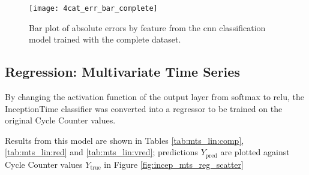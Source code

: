 \begin{figure}
    \centering
    \texttt{[image: 4cat\_err\_bar\_complete]}
    \caption{\label{fig:classif_pred_hist} Bar plot of absolute errors by feature from the \ac{cnn} classification model trained with the complete dataset.}
\end{figure}

\subsection{Regression: Multivariate Time Series}
By changing the activation function of the output layer from softmax to \ac{relu}, the InceptionTime classifier was converted into a regressor to be trained on the original Cycle Counter values.

Results from this model are shown in Tables \ref{tab:mts_lin:comp}, \ref{tab:mts_lin:red} and \ref{tab:mts_lin:vred}; predictions \(Y_{\text{pred}}\) are plotted against Cycle Counter values \(Y_{\text{true}}\) in Figure \ref{fig:incep_mts_reg_scatter}

